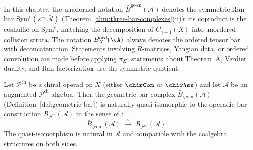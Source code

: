 \begin{remark}\label{rem:three-bar-conventions}
In this chapter, the unadorned notation
$\bar{B}^{\mathrm{geom}}(\mathcal{A})$ denotes the symmetric Ran bar
$\mathrm{Sym}^c(s^{-1}\bar{\mathcal{A}})$
(Theorem~\ref{thm:three-bar-complexes}(ii)); its coproduct is the
coshuffle on $\mathrm{Sym}^c$, matching the decomposition of
$\overline{C}_{n+1}(X)$ into unordered collision strata. The notation
$B_X^{\mathrm{ord}}(\cA)$ always denotes the ordered tensor bar with
deconcatenation. Statements involving $R$-matrices, Yangian data, or
ordered convolution are made before applying $\pi_\Sigma$; statements
about Theorem~A, Verdier duality, and Ran factorization use the
symmetric quotient.
\end{remark}

\begin{theorem}[Geometric bar \texorpdfstring{$=$}{=} operadic bar; \ClaimStatusProvedHere]
\label{thm:geometric-equals-operadic-bar}
Let $\mathcal{P}^{\mathrm{ch}}$ be a chiral operad on $X$ (either
$\chirCom$ or $\chirAss$) and let $\mathcal{A}$ be an augmented
$\mathcal{P}^{\mathrm{ch}}$-algebra. Then the geometric bar complex
$\bar{B}_{\mathrm{geom}}(\mathcal{A})$
(Definition~\ref{def:geometric-bar}) is naturally quasi-isomorphic
to the operadic bar construction
$B_{\mathcal{P}^{\mathrm{ch}}}(\mathcal{A})$ in the sense of
\cite[\S6.5]{LV12}:
\[
\bar{B}_{\mathrm{geom}}(\mathcal{A})
\;\xrightarrow{\;\sim\;}\;
B_{\mathcal{P}^{\mathrm{ch}}}(\mathcal{A}).
\]
The quasi-isomorphism is natural in $\mathcal{A}$ and compatible
with the coalgebra structures on both sides.
\end{theorem}

